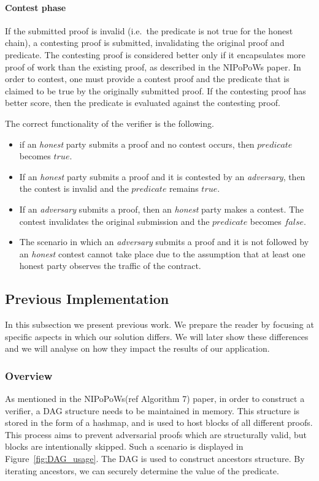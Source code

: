 \paragraph{Contest phase} If the submitted proof is invalid (i.e.\ the
predicate is not true for the honest chain), a contesting proof is
submitted, invalidating the original proof and predicate. The
contesting proof is considered better only if it encapsulates more
proof of work than the existing proof, as described in the NIPoPoWs
paper. In order to contest, one must provide a contest proof and the predicate
that is claimed to be true by the originally submitted proof. If the contesting
proof has better score, then the predicate is evaluated against the contesting
proof.

The correct functionality of the verifier is the following.
\begin{itemize}
    \item
        if an \textit{honest} party submits a proof and no contest occurs, then
        $predicate$ becomes $true$.
    \item
        If an \textit{honest} party submits a proof and it is contested by an
        \textit{adversary}, then the contest is invalid and the $predicate$
        remains $true$.
    \item
        If an \textit{adversary} submits a proof, then an \textit{honest} party
        makes a contest. The contest invalidates the original submission and
        the $predicate$ becomes $false$.
    \item
        The scenario in which an \textit{adversary} submits a proof and it is not
        followed by an \textit{honest} contest cannot take place due to the assumption
        that at least one honest party observes the traffic of the contract.
\end{itemize}

\subsection{Previous Implementation}

In this subsection we present previous work. We prepare the reader by focusing
at specific aspects in which our solution differs. We will later show these
differences and we will analyse on how they impact the results of our
application.

\subsubsection{Overview}
As mentioned in the NIPoPoWs(ref Algorithm 7) paper, in order to construct a
verifier, a DAG structure needs to be maintained in memory. This structure is
stored in the form of a hashmap, and is used to host blocks of all different
proofs. This process aims to prevent adversarial proofs which are structurally
valid, but blocks are intentionally skipped. Such a scenario is displayed in
Figure~\ref{fig:DAG_usage}. The DAG is used to construct ancestors structure.
By iterating ancestors, we can securely determine the value of the predicate.

